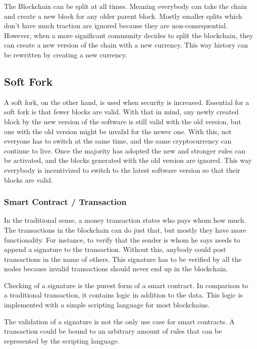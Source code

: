 \documentclass[a4paper, 11pt]{scrartcl}
\begin{document}
The Blockchain can be split at all times.
Meaning everybody can take the chain and create a new block for any older parent block.
Mostly smaller splits which don't have much traction are ignored because they are non-consequential. However, when a more significant community decides to split the blockchain, they can create a new version of the chain with a new currency. This way history can be rewritten by creating a new currency. 

\subsection{Soft Fork}

A soft fork, on the other hand, is used when security is increased. Essential for a soft fork is that fewer blocks are valid. With that in mind, any newly created block by the new version of the software is still valid with the old version, but one with the old version might be invalid for the newer one. With this, not everyone has to switch at the same time, and the same cryptocurrency can continue to live. Once the majority has adopted the new and stronger rules can be activated, and the blocks generated with the old version are ignored. This way everybody is incentivized to switch to the latest software version so that their blocks are valid. \cite{blockchainKai}

\subsubsection{Smart Contract / Transaction}

In the traditional sense, a money transaction states who pays whom how much.
The transactions in the blockchain can do just that, but mostly they have more functionality.
For instance, to verify that the sender is whom he says needs to append a signature to the transaction.
Without this, anybody could post transactions in the name of others.
This signature has to be verified by all the nodes because invalid transactions should never end up in the blockchain. \cite{blockchainKai}

Checking of a signature is the purest form of a smart contract.
In comparison to a traditional transaction, it contains logic in addition to the data.
This logic is implemented with a simple scripting language for most blockchains. \cite{blockchainKai}

The validation of a signature is not the only use case for smart contracts.
A transaction could be bound to an arbitrary amount of rules that can be represented by the scripting language. \cite{blockchainKai}
\end{document}
